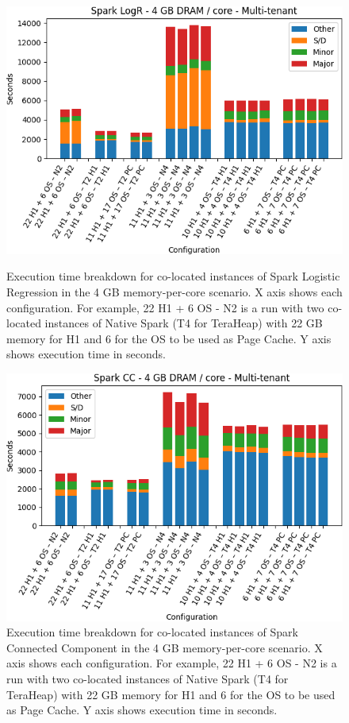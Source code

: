 \begin{figure}[thbp]
        \centering
    \includegraphics[width=\linewidth]{./fig/logr64.png}
    \caption{Execution time breakdown for co-located instances of Spark
    Logistic Regression in the 4 GB memory-per-core scenario. X axis shows each configuration.
        For example, 22 H1 + 6 OS - N2 is a run with two co-located instances of Native Spark (T4 for TeraHeap) with 22 GB memory for H1 and 6 for the OS to be used as Page Cache. Y axis shows execution time in seconds.}
    \label{fig:logr64}

    \includegraphics[width=\linewidth]{./fig/cc64.png}
    \caption{Execution time breakdown for co-located instances of Spark
    Connected Component in the 4 GB memory-per-core scenario. X axis shows each configuration.
        For example, 22 H1 + 6 OS - N2 is a run with two co-located instances of Native Spark (T4 for TeraHeap) with 22 GB memory for H1 and 6 for the OS to be used as Page Cache. Y axis shows execution time in seconds.}
    \label{fig:cc64}
\end{figure}

